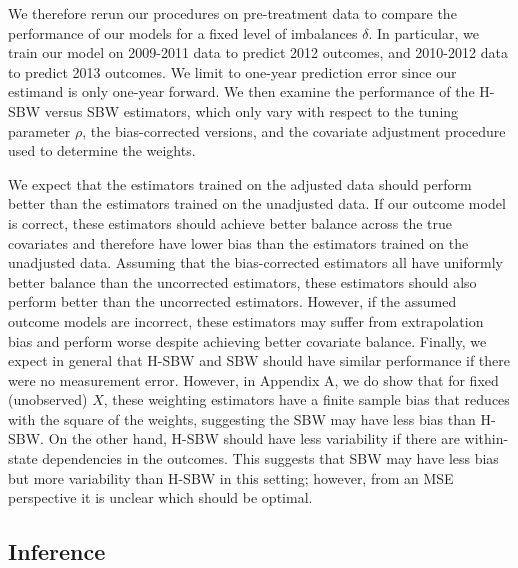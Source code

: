 We therefore rerun our procedures on pre-treatment data to compare the performance of our models for a fixed level of imbalances $\delta$. In particular, we train our model on 2009-2011 data to predict 2012 outcomes, and 2010-2012 data to predict 2013 outcomes. We limit to one-year prediction error since our estimand is only one-year forward. We then examine the performance of the H-SBW versus SBW estimators, which only vary with respect to the tuning parameter $\rho$, the bias-corrected versions, and the covariate adjustment procedure used to determine the weights. 

We expect that the estimators trained on the adjusted data should perform better than the estimators trained on the unadjusted data. If our outcome model is correct, these estimators should achieve better balance across the true covariates and therefore have lower bias than the estimators trained on the unadjusted data. Assuming that the bias-corrected estimators all have uniformly better balance than the uncorrected estimators, these estimators should also perform better than the uncorrected estimators. However, if the assumed outcome models are incorrect, these estimators may suffer from extrapolation bias and perform worse despite achieving better covariate balance. Finally, we expect in general that H-SBW and SBW should have similar performance if there were no measurement error. However, in Appendix A, we do show that for fixed (unobserved) $X$, these weighting estimators have a finite sample bias that reduces with the square of the weights, suggesting the SBW may have less bias than H-SBW. On the other hand, H-SBW should have less variability if there are within-state dependencies in the outcomes. This suggests that SBW may have less bias but more variability than H-SBW in this setting; however, from an MSE perspective it is unclear which should be optimal.

\subsection{Inference}

